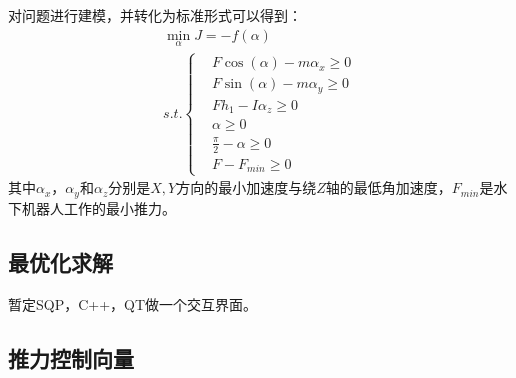 对问题进行建模，并转化为标准形式可以得到：
\begin{equation}
    \begin{split}
    \label{equ:2-4}
    \underset{\alpha}{\min}  J = -f(\alpha)
    \\ s.t.
    \begin{cases}&F\cos(\alpha)-m{\alpha}_x\geq0 \\&F\sin(\alpha)-m{\alpha}_y \geq0\\&Fh_1-I{\alpha}_z\geq0\\&\alpha\geq0\\&\frac{\pi}{2}-\alpha\geq0\\&F-F_{min}\geq0
        \end{cases}
    \end{split}
\end{equation}
其中${\alpha}_x，{\alpha}_y$和${\alpha}_z$分别是$X,Y$方向的最小加速度与绕$Z$轴的最低角加速度，$F_{min}$是水下机器人工作的最小推力。
\subsection{最优化求解}

暂定SQP，C++，QT做一个交互界面。

\subsection{推力控制向量}

